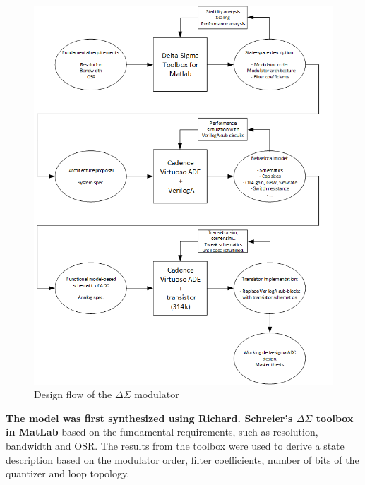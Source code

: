 \begin{figure}[H]
\centering
\includegraphics[scale = 0.6]{images/design_slow.png}
\caption{Design flow of the $\Delta\Sigma$ modulator}
\label{intro_design_flow}
\end{figure}

\textbf{The model was first synthesized using Richard. Schreier’s $\Delta\Sigma$ toolbox in MatLab\cite{tool}} based on the fundamental requirements, such as resolution, bandwidth and OSR. The results from the toolbox were used to derive a state description based on the modulator order, filter coefficients, number of bits of the quantizer and loop topology.  
